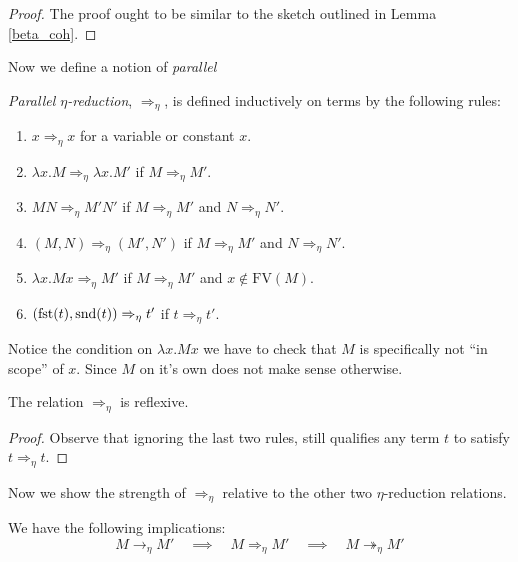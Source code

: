 \begin{proof}
    The proof ought to be similar to the sketch outlined in Lemma \ref{beta_coh}.
\end{proof}

Now we define a notion of \emph{parallel}

\begin{defin}\label{eta_par}
    \emph{Parallel $\eta$-reduction}, $\Rightarrow_\eta$, is defined inductively on terms by the following rules:
    \begin{enumerate}
        \item $x \Rightarrow_\eta x$ for a variable or constant $x$.
        \item $\lambda x . M \Rightarrow_\eta \lambda x . M'$ if $M \Rightarrow_\eta M'$.
        \item $M N \Rightarrow_\eta M' N'$ if $M \Rightarrow_\eta M'$ and $N \Rightarrow_\eta N'$.
        \item $(M, N) \Rightarrow_\eta (M', N')$ if $M \Rightarrow_\eta M'$ and $N \Rightarrow_\eta N'$.
        \item $\lambda x . M x \Rightarrow_\eta M'$ if $M \Rightarrow_\eta M'$ and $x \not\in \mathrm{FV}(M)$.
        \item $(\mathrm{fst}(t), \mathrm{snd}(t)) \Rightarrow_\eta t'$ if $t \Rightarrow_\eta t'$.
    \end{enumerate}
\end{defin}

\begin{remark}
    Notice the condition on $\lambda x . M x$ we have to check that $M$ is specifically not ``in scope'' of $x$. Since $M$ on it's own does not make sense otherwise.
\end{remark}

\begin{cor}
    The relation $\Rightarrow_\eta$ is reflexive.
\end{cor}

\begin{proof}
    Observe that ignoring the last two rules, still qualifies any term $t$ to satisfy $t \Rightarrow_\eta t$.
\end{proof}

Now we show the strength of $\Rightarrow_\eta$ relative to the other two $\eta$-reduction relations.

\begin{lemma}\label{eta_par_imp}
    We have the following implications:
    $$
        M \to_\eta M' \quad \implies \quad M \Rightarrow_\eta M' \quad \implies \quad M \twoheadrightarrow_\eta M'
    $$
\end{lemma}

